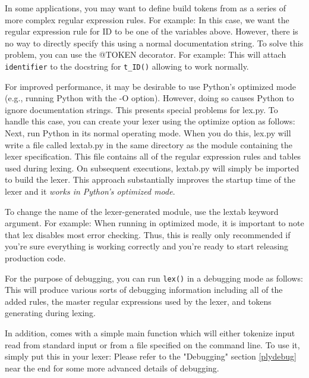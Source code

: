 
In some applications, you may want to define build tokens from as a series of
more complex regular expression rules. For example:
In this case, we want the regular expression rule for ID to be one of the
variables above. However, there is no way to directly specify this using a
normal documentation string. To solve this problem, you can use the @TOKEN
decorator. For example:
This will attach \verb|identifier| to the docstring for \verb|t_ID()| allowing
 to work normally.


For improved performance, it may be desirable to use Python's optimized mode
(e.g., running Python with the -O option). However, doing so causes Python to
ignore documentation strings. This presents special problems for lex.py. To
handle this case, you can create your lexer using the optimize option as
follows:
Next, run Python in its normal operating mode. When you do this, lex.py will
write a file called lextab.py in the same directory as the module containing the
lexer specification. This file contains all of the regular expression rules and
tables used during lexing. On subsequent executions, lextab.py will simply be
imported to build the lexer. This approach substantially improves the startup
time of the lexer and it \emph{works in Python's optimized mode}.

To change the name of the lexer-generated module, use the lextab keyword
argument. For example:
When running in optimized mode, it is important to note that lex disables most
error checking. Thus, this is really only recommended if you're sure everything
is working correctly and you're ready to start releasing production code.


For the purpose of debugging, you can run \verb|lex()| in a debugging mode as
follows:
This will produce various sorts of debugging information including all of the
added rules, the master regular expressions used by the lexer, and tokens
generating during lexing.

In addition,  comes with a simple main function which will either
tokenize input read from standard input or from a file specified on the command
line. To use it, simply put this in your lexer:
Please refer to the "Debugging" section \ref{plydebug} near the end for some
more advanced details of debugging.

